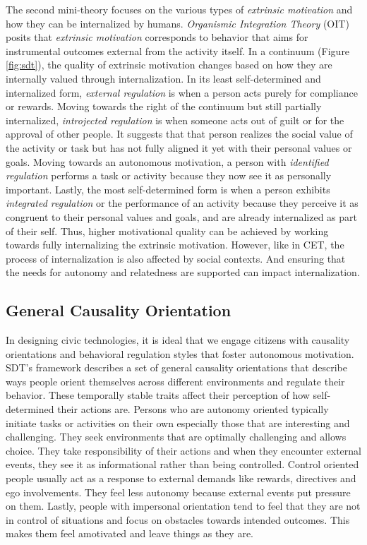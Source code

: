The second mini-theory focuses on the various types of \textit{extrinsic motivation} and how they can be internalized by humans\cite{ryan2000intrinsic,deci2002overview,ryan2017organismic}. \textit{Organismic Integration Theory} (OIT) posits that \textit{extrinsic motivation} corresponds to behavior that aims for instrumental outcomes external from the activity itself. In a continuum (Figure \ref{fig:sdt}), the quality of extrinsic motivation changes based on how they are internally valued through internalization. In its least self-determined and internalized form, \textit{external regulation} is when a person acts purely for compliance or rewards. Moving towards the right of the continuum but still partially internalized, \textit{introjected regulation} is when someone acts out of guilt or for the approval of other people. It suggests that that person realizes the social value of the activity or task but has not fully aligned it yet with their personal values or goals. Moving towards an autonomous motivation, a person with \textit{identified regulation} performs a task or activity because they now see it as personally important. Lastly, the most self-determined form is when a person exhibits \textit{integrated regulation} or the performance of an activity because they perceive it as congruent to their personal values and goals, and are already internalized as part of their self. Thus, higher motivational quality can be achieved by working towards fully internalizing the extrinsic motivation. However, like in CET, the process of internalization is also affected by social contexts. And ensuring that the needs for autonomy and relatedness are supported can impact internalization. 

\subsection{General Causality Orientation}
In designing civic technologies, it is ideal that we engage citizens with causality orientations and behavioral regulation styles that foster autonomous motivation. SDT's framework describes a set of general causality orientations that describe ways people orient themselves across different environments and regulate their behavior. These temporally stable traits affect their perception of how self-determined their actions are. Persons who are autonomy oriented typically initiate tasks or activities on their own especially those that are interesting and challenging. They seek environments that are optimally challenging and allows choice. They take responsibility of their actions and when they encounter external events, they see it as informational rather than being controlled. Control oriented people usually act as a response to external demands like rewards, directives and ego involvements. They feel less autonomy because external events put pressure on them. Lastly, people with impersonal orientation tend to feel that they are not in control of situations and focus on obstacles towards intended outcomes. This makes them feel amotivated and leave things as they are. 

